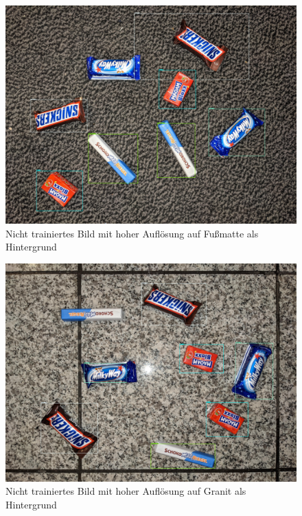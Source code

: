     \begin{figure}[H]
        \centering
        \includegraphics[angle = 90, width = \textwidth]{Bilder/models/model_comparison/efficientdet_d1_coco17_tpu-32/HD_on_doormat.jpg}
        \caption{Nicht trainiertes Bild mit hoher Auflösung auf Fußmatte als Hintergrund}
    \end{figure}
    
    \begin{figure}[H]
        \centering
        \includegraphics[angle = 90, width = \textwidth]{Bilder/models/model_comparison/efficientdet_d1_coco17_tpu-32/HD_on_granite.jpg}
        \caption{Nicht trainiertes Bild mit hoher Auflösung auf Granit als Hintergrund}
    \end{figure}
    
